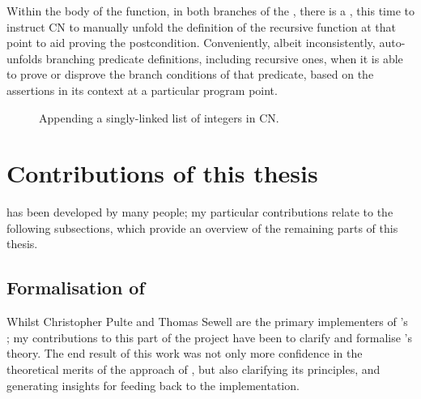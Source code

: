 Within the body of the function, in both branches of the , there is
a , this time to instruct CN to manually unfold the definition
of the recursive function at that point to aid proving the postcondition.
Conveniently, albeit
inconsistently,
 auto-unfolds branching predicate definitions, including recursive ones,
when it is able to prove or disprove the branch conditions of that predicate,
based on the assertions in its context at a particular program point.

\begin{figure}[tp]
    \begin{minipage}{.85\textwidth}
    \end{minipage}%
    \begin{minipage}{.65\textwidth}
    \end{minipage}
    \caption{Appending a singly-linked list of integers in CN.}\label{fig:append-cn}
\end{figure}%

\section{Contributions of this thesis}\label{sec:contributions}

 has been developed by many people; my particular contributions relate
to the following subsections, which provide an overview of the remaining parts
of this thesis.

\subsection{Formalisation of }

Whilst Christopher Pulte and Thomas Sewell are the primary implementers of
's ; my contributions to this part of the project have
been to clarify and formalise 's theory. The end result of this work was
not only more confidence in the theoretical merits of the approach of ,
but also clarifying its principles, and generating insights for feeding back to
the implementation.

